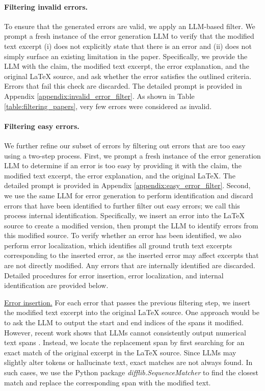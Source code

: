 \documentclass{article}
\begin{document}
\paragraph{Filtering invalid errors.} To ensure that the generated errors are valid, we apply an LLM-based filter. We prompt a fresh instance of the error generation LLM to verify that the modified text excerpt (i) does not explicitly state that there is an error and (ii) does not simply surface an existing limitation in the paper. Specifically, we provide the LLM with the claim, the modified text excerpt, the error explanation, and the original LaTeX source, and ask whether the error satisfies the outlined criteria. Errors that fail this check are discarded. The detailed prompt is provided in Appendix \ref{appendix:invalid_error_filter}. As shown in Table \ref{table:filtering_papers}, very few errors were considered as invalid.

\paragraph{Filtering easy errors.} We further refine our subset of errors by filtering out errors that are too easy using a two-step process. First, we prompt a fresh instance of the error generation LLM to determine if an error is too easy by providing it with the claim, the modified text excerpt, the error explanation, and the original LaTeX. The detailed prompt is provided in Appendix \ref{appendix:easy_error_filter}. Second, we use the same LLM for error generation to perform identification and discard errors that have been identified to further filter out easy errors; we call this process internal identification. Specifically, we insert an error into the LaTeX source to create a modified version, then prompt the LLM to identify errors from this modified source. To verify whether an error has been identified, we also perform error localization, which identifies all ground truth text excerpts corresponding to the inserted error, as the inserted error may affect excerpts that are not directly modified. Any errors that are internally identified are discarded. Detailed procedures for error insertion, error localization, and internal identification are provided below.

\underline{Error insertion.} For each error that passes the previous filtering step, we insert the modified text excerpt into the original LaTeX source. One approach would be to ask the LLM to output the start and end indices of the spans it modified. However, recent work shows that LLMs cannot consistently output numerical text spans \citep{hasanain2024, kasner2025}. Instead, we locate the replacement span by first searching for an exact match of the original excerpt in the LaTeX source. Since LLMs may slightly alter tokens or hallucinate text, exact matches are not always found. In such cases, we use the Python package \textit{difflib.SequenceMatcher} \citep{difflib} to find the closest match and replace the corresponding span with the modified text.
\end{document}
